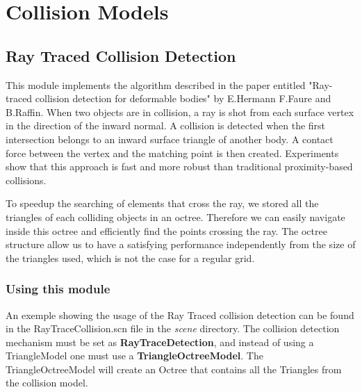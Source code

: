 \section{Collision Models}
\subsection{Ray Traced Collision Detection}
This module implements the algorithm described in the paper entitled "Ray-traced collision detection for deformable bodies" by E.Hermann F.Faure and B.Raffin. When two objects are in collision, a ray is shot from each surface vertex in the direction of the inward normal. A collision is detected when the first intersection belongs to an inward surface triangle of another body.  A contact force between the vertex and the matching point is then created. Experiments  show that this approach is fast and more robust than traditional proximity-based collisions.

 To speedup the  searching of elements that cross the ray,   we  stored all the triangles of each colliding objects in an  octree. Therefore we can easily navigate inside this octree and efficiently find the points crossing the ray. The octree structure allow us to have a satisfying performance independently from the size of the triangles used, which is not the case for  a regular grid.


\subsubsection{Using this module}
An exemple showing the usage of the Ray Traced collision detection can be found in the  RayTraceCollision.scn file in the \textit{scene} directory. The collision detection mechanism must be set as \textbf{RayTraceDetection}, and instead of using a TriangleModel one must use a \textbf{TriangleOctreeModel}. The TriangleOctreeModel will create an Octree that contains all the Triangles from the collision model. 
	
